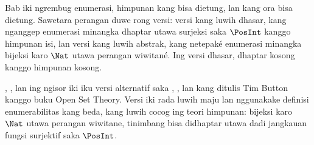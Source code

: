 \documentclass[../../../include/open-logic-chapter]{subfiles}
\begin{document}

\begin{editorial}
Bab iki ngrembug enumerasi, himpunan kang bisa dietung, lan kang ora bisa dietung.
Sawetara perangan duwe rong versi: versi kang luwih dhasar,
kang nganggep enumerasi minangka dhaptar utawa surjeksi saka $\PosInt$
kanggo himpunan isi, lan versi kang luwih abstrak,
kang netepaké enumerasi minangka bijeksi karo $\Nat$ utawa perangan wiwitané.
Ing versi dhasar, dhaptar kosong kanggo himpunan kosong.
\end{editorial}











\begin{editorial}
,
, lan  ing ngisor iki
iku versi alternatif saka ,
, lan  kang ditulis Tim
Button kanggo buku Open Set Theory. Versi iki rada luwih
maju lan nggunakake definisi enumerabilitas kang beda, kang luwih
cocog ing teori himpunan: bijeksi karo $\Nat$ utawa
perangan wiwitane, tinimbang bisa didhaptar utawa dadi jangkauan
fungsi surjektif saka $\PosInt$.
\end{editorial}


\OLEndChapterHook
\end{document}
